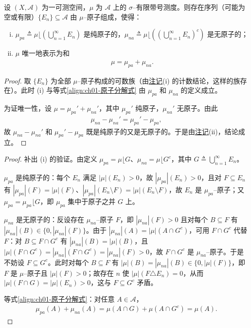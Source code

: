 \documentclass[../../main.tex]{subfiles}%
\begin{document}
\begin{proposition}\label{proposition:ch01-原子分解}
设 $(X,\mathcal{A})$ 为一可测空间，$\mu$ 为 $\mathcal{A}$ 上的 $\sigma$--有限带号测度。则存在序列（可能为空或有限）$\{E_n\}\subseteq\mathcal{A}$ 由 $\mu$--原子组成，使得：
\begin{enumerate}[(i)]
\item $\mu_{pa}\triangleq\mu\lfloor\left(\bigcup_{n=1}^\infty E_n\right)$ 是纯原子的，$\mu_{na}\triangleq\mu\lfloor\left(\left(\bigcup_{n=1}^\infty E_n\right)^c\right)$ 是无原子的；
\item $\mu$ 唯一地表示为和
\begin{align}
\mu=\mu_{pa}+\mu_{na}. \label{align:ch01-原子分解式}
\end{align}
\end{enumerate}
\end{proposition}

\begin{proof}
取 $\{E_n\}$ 为全部 $\mu$--原子构成的可数族（由\hyperref[remark:ch01-原子注记]{注记}(i) 的计数结论，这样的族存在）。此时 (i) 与等式\eqref{align:ch01-原子分解式} 由 $\mu_{pa}$ 和 $\mu_{na}$ 的定义成立。

为证唯一性，设 $\mu=\mu_{pa}'+\mu_{na}'$，其中 $\mu_{pa}'$ 纯原子，$\mu_{na}'$ 无原子。由此
\begin{align*}
\mu_{na}-\mu_{na}'=\mu_{pa}'-\mu_{pa},
\end{align*}
故 $\mu_{na}-\mu_{na}'$ 和 $\mu_{pa}'-\mu_{pa}$ 既是纯原子的又是无原子的。于是由\hyperref[remark:ch01-原子注记]{注记}(ii)，结论成立。
\end{proof}

\begin{proof}
补出 (i) 的验证。由定义 $\mu_{pa}=\mu\lfloor G$、$\mu_{na}=\mu\lfloor G^c$，其中 $G\triangleq\bigcup_{n=1}^\infty E_n$。

$\mu_{pa}$ 是纯原子的：每个 $E_n$ 满足 $|\mu|(E_n)>0$，故 $|\mu_{pa}|(E_n)>0$，且对 $F\subseteq E_n$ 有 $|\mu_{pa}|(F)=|\mu|(F)$、$|\mu_{pa}|(E_n\setminus F)=|\mu|(E_n\setminus F)$，故 $E_n$ 是 $\mu_{pa}$--原子；又 $\mu_{pa}=\mu_{pa}\lfloor G$，即 $\mu_{pa}$ 集中于原子之并 $G$ 上。

$\mu_{na}$ 是无原子的：反设存在 $\mu_{na}$--原子 $F$，即 $|\mu_{na}|(F)>0$ 且对每个 $B\subseteq F$ 有 $|\mu_{na}|(B)\in\{0,|\mu_{na}|(F)\}$。由于 $|\mu_{na}|(A)=|\mu|(A\cap G^c)$，可用 $F\cap G^c$ 代替 $F$：对 $B\subseteq F\cap G^c$ 有 $|\mu_{na}|(B)=|\mu|(B)$，且 $|\mu|(F\cap G^c)=|\mu_{na}|(F\cap G^c)=|\mu_{na}|(F)>0$，故 $F\cap G^c$ 是 $\mu_{na}$--原子。于是不妨设 $F\subseteq G^c$。此时对每个 $B\subseteq F$ 有 $|\mu|(B)=|\mu_{na}|(B)\in\{0,|\mu|(F)\}$，即 $F$ 是 $\mu$--原子且 $|\mu|(F)>0$；故存在 $n$ 使 $|\mu|(F\triangle E_n)=0$，从而 $|\mu|(F\cap G)=|\mu|(E_n)>0$，这与 $F\subseteq G^c$ 矛盾。

等式\eqref{align:ch01-原子分解式}：对任意 $A\in\mathcal{A}$，
\begin{align*}
\mu_{pa}(A)+\mu_{na}(A)=\mu(A\cap G)+\mu(A\cap G^c)=\mu(A).
\end{align*}
\end{proof}
\end{document}
